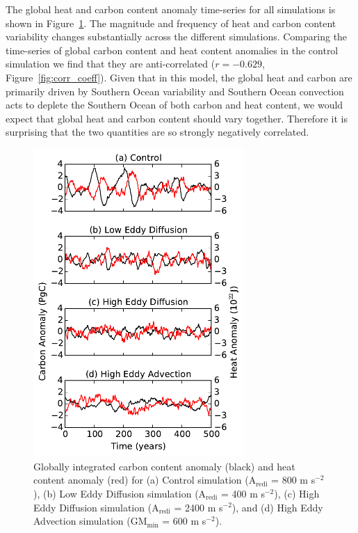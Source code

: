 The global heat and carbon content anomaly time-series for all simulations is
shown in Figure~\ref{fig:heat_carbon_ts}. The
magnitude and frequency of heat and carbon content variability changes
substantially across the different simulations.  Comparing the time-series
of global carbon content and heat content anomalies in the control simulation we
find that they are anti-correlated ($r=-0.629$, Figure~\ref{fig:corr_coeff}).
Given that in this model, the global heat and carbon are primarily driven
by Southern Ocean variability and Southern Ocean convection acts to deplete the
Southern Ocean of both carbon and heat content, we would expect that global heat
and carbon content should vary together. Therefore it is surprising that the two
quantities are so strongly negatively correlated.

\begin{figure}
\centering
\includegraphics[width=19pc]{figure5.pdf}
\caption{Globally integrated carbon content anomaly (black) and heat content
anomaly (red) for (a) Control
simulation (A$_{\mathrm{redi}}$ = 800 m s$^{-2}$), (b) Low Eddy Diffusion simulation
(A$_{\mathrm{redi}}$ = 400 m s$^{-2}$), (c) High Eddy Diffusion simulation
(A$_{\mathrm{redi}}$ = 2400 m s$^{-2}$), and (d) High Eddy Advection simulation
(GM$_{\min}$ = 600 m s$^{-2}$).}
\label{fig:heat_carbon_ts}
\end{figure}

